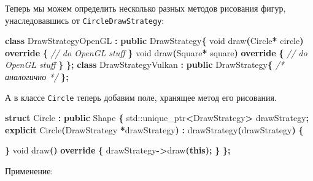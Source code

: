\documentclass[14pt,a4paper]{article}
\newenvironment{Shaded}{\begin{paragraph}}{\end{paragraph}}
\newenvironment{Highlighting}{\begin{paragraph}}{\end{paragraph}}
\newcommand{\KeywordTok}[1]{\textcolor[rgb]{0.13,0.29,0.53}{\textbf{#1}}}
\newcommand{\DataTypeTok}[1]{\textcolor[rgb]{0.13,0.29,0.53}{#1}}
\newcommand{\CommentTok}[1]{\textcolor[rgb]{0.56,0.35,0.01}{\textit{#1}}}
\newcommand{\OperatorTok}[1]{\textcolor[rgb]{0.81,0.36,0.00}{\textbf{#1}}}
\newcommand{\BuiltInTok}[1]{#1}
\newcommand{\NormalTok}[1]{#1}
\begin{document}
Теперь мы можем определить несколько разных методов рисования фигур,
унаследовавшись от \texttt{CircleDrawStrategy}:

\begin{Shaded}
\begin{Highlighting}[]
\KeywordTok{class}\NormalTok{ DrawStrategyOpenGL }\OperatorTok{:} \KeywordTok{public}\NormalTok{ DrawStrategy}\OperatorTok{\{}
    \DataTypeTok{void}\NormalTok{ draw}\OperatorTok{(}\NormalTok{Circle}\OperatorTok{*}\NormalTok{ circle}\OperatorTok{)} \KeywordTok{override} \OperatorTok{\{}
        \CommentTok{// do OpenGL stuff}
    \OperatorTok{\}}
    \DataTypeTok{void}\NormalTok{ draw}\OperatorTok{(}\NormalTok{Square}\OperatorTok{*}\NormalTok{ square}\OperatorTok{)} \KeywordTok{override} \OperatorTok{\{}
        \CommentTok{// do OpenGL stuff}
    \OperatorTok{\}}
\OperatorTok{\};}
\KeywordTok{class}\NormalTok{ DrawStrategyVulkan }\OperatorTok{:} \KeywordTok{public}\NormalTok{ DrawStrategy}\OperatorTok{\{}
    \CommentTok{/* аналогично */}
\OperatorTok{\};}
\end{Highlighting}
\end{Shaded}

А в классе \texttt{Circle} теперь добавим поле, хранящее метод его
рисования.

\begin{Shaded}
\begin{Highlighting}[]
\KeywordTok{struct}\NormalTok{ Circle }\OperatorTok{:} \KeywordTok{public}\NormalTok{ Shape }\OperatorTok{\{}
    \BuiltInTok{std::}\NormalTok{unique\_ptr}\OperatorTok{\textless{}}\NormalTok{DrawStrategy}\OperatorTok{\textgreater{}}\NormalTok{ drawStrategy}\OperatorTok{;}
    \KeywordTok{explicit}\NormalTok{ Circle}\OperatorTok{(}\NormalTok{DrawStrategy }\OperatorTok{*}\NormalTok{drawStrategy}\OperatorTok{)} 
        \OperatorTok{:}\NormalTok{ drawStrategy}\OperatorTok{(}\NormalTok{drawStrategy}\OperatorTok{)} \OperatorTok{\{}
        
    \OperatorTok{\}}
    \DataTypeTok{void}\NormalTok{ draw}\OperatorTok{()} \KeywordTok{override} \OperatorTok{\{}
\NormalTok{        drawStrategy}\OperatorTok{{-}\textgreater{}}\NormalTok{draw}\OperatorTok{(}\KeywordTok{this}\OperatorTok{);}
    \OperatorTok{\}}
\OperatorTok{\};}
\end{Highlighting}
\end{Shaded}

Применение:
\end{document}
